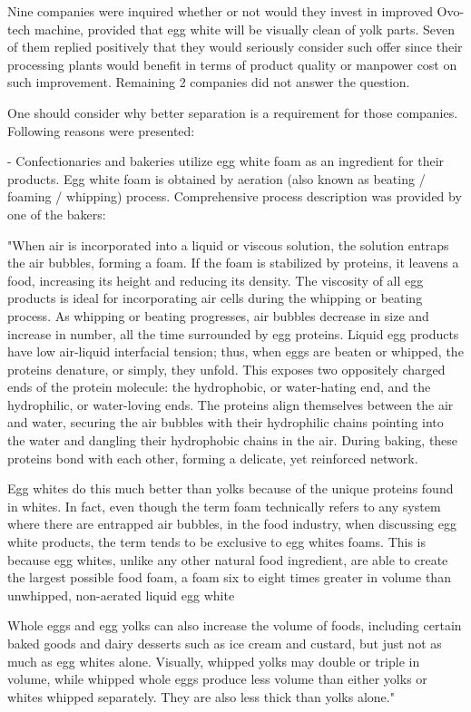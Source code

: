 \documentclass[12pt,twoside,a4paper]{article}
\begin{document}
Nine companies were inquired whether or not would they invest in improved Ovo-tech machine, provided that egg white will be visually clean of yolk parts. 
Seven of them replied positively that they would seriously consider such offer since their processing plants would benefit in terms of product quality or manpower cost on such improvement.
Remaining 2 companies did not answer the question.

One should consider why better separation is a requirement for those companies.
Following reasons were presented:

- Confectionaries and bakeries utilize egg white foam as an ingredient for their products. 
Egg white foam is obtained by aeration (also known as beating / foaming / whipping) process.
Comprehensive process description was provided by one of the bakers:

"When air is incorporated into a liquid or viscous solution, the solution entraps the air bubbles, forming a foam. If the foam is stabilized by proteins, it leavens a food, increasing its height and reducing its density. The viscosity of all egg products is ideal for incorporating air cells during the whipping or beating process. As whipping or beating progresses, air bubbles decrease in size and increase in number, all the time surrounded by egg proteins. Liquid egg products have low air-liquid interfacial tension; thus, when eggs are beaten or whipped, the proteins denature, or simply, they unfold. This exposes two oppositely charged ends of the protein molecule: the hydrophobic, or water-hating end, and the hydrophilic, or water-loving ends. The proteins align themselves between the air and water, securing the air bubbles with their hydrophilic chains pointing into the water and dangling their hydrophobic chains in the air. During baking, these proteins bond with each other, forming a delicate, yet reinforced network.

Egg whites do this much better than yolks because of the unique proteins found in whites. In fact, even though the term foam technically refers to any system where there are entrapped air bubbles, in the food industry, when discussing egg white products, the term tends to be exclusive to egg whites foams. This is because egg whites, unlike any other natural food ingredient, are able to create the largest possible food foam, a foam six to eight times greater in volume than unwhipped, non-aerated liquid egg white

Whole eggs and egg yolks can also increase the volume of foods, including certain baked goods and dairy desserts such as ice cream and custard, but just not as much as egg whites alone. Visually, whipped yolks may double or triple in volume, while whipped whole eggs produce less volume than either yolks or whites whipped separately. They are also less thick than yolks alone." \cite{eggprop}
\end{document}
